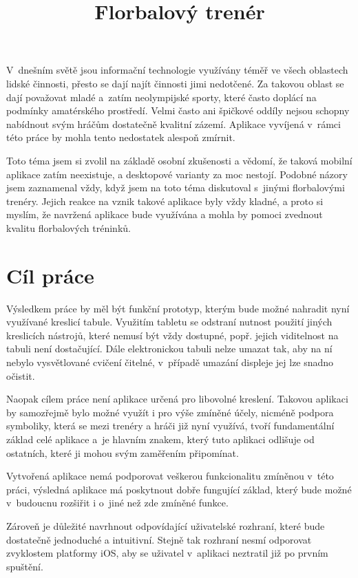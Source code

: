 \documentclass[thesis=B,czech]{FITthesis}[2012/06/26]
\title{Florbalový trenér}
\begin{document}

\begin{introduction}
	V~dnešním světě jsou informační technologie využívány téměř ve všech oblastech lidské činnosti, přesto se dají najít činnosti jimi nedotčené. Za takovou oblast se dají považovat mladé a~zatím neolympijské sporty, které často doplácí na podmínky amatérského prostředí. Velmi často ani špičkové oddíly nejsou schopny nabídnout svým hráčům dostatečně kvalitní zázemí. Aplikace vyvíjená v~rámci této práce by mohla tento nedostatek alespoň zmírnit.

	Toto téma jsem si zvolil na základě osobní zkušenosti a vědomí, že taková mobilní aplikace zatím neexistuje, a desktopové varianty za moc nestojí. Podobné názory jsem zaznamenal vždy, když jsem na toto téma diskutoval s~jinými florbalovými trenéry. Jejich reakce na vznik takové aplikace byly vždy kladné, a proto si myslím, že navržená aplikace bude využívána a mohla by pomoci zvednout kvalitu florbalových tréninků.
\end{introduction}

\chapter{Cíl práce}
	Výsledkem práce by měl být funkční prototyp, kterým bude možné nahradit nyní využívané kreslicí tabule. Využitím tabletu se odstraní nutnost použití jiných kreslicích nástrojů, které nemusí být vždy dostupné, popř. jejich viditelnost na tabuli není dostačující. Dále elektronickou tabuli nelze umazat tak, aby na ní nebylo vysvětlované cvičení čitelné, v~případě umazání displeje jej lze snadno očistit.

	Naopak cílem práce není aplikace určená pro libovolné kreslení. Takovou aplikaci by samozřejmě bylo možné využít i pro výše zmíněné účely, nicméně podpora symboliky, která se mezi trenéry a hráči již nyní využívá, tvoří fundamentální základ celé aplikace a~je hlavním znakem, který tuto aplikaci odlišuje od ostatních, které ji mohou svým zaměřením připomínat.

	Vytvořená aplikace nemá podporovat veškerou funkcionalitu zmíněnou v~této práci, výsledná aplikace má poskytnout dobře fungující základ, který bude možné v~budoucnu rozšiřit i o~jiné než zde zmíněné funkce.

	Zároveň je důležité navrhnout odpovídající uživatelské rozhraní, které bude dostatečně jednoduché a intuitivní. Stejně tak rozhraní nesmí odporovat zvyklostem platformy iOS, aby se uživatel v~aplikaci neztratil již po prvním spuštění.
\end{document}
